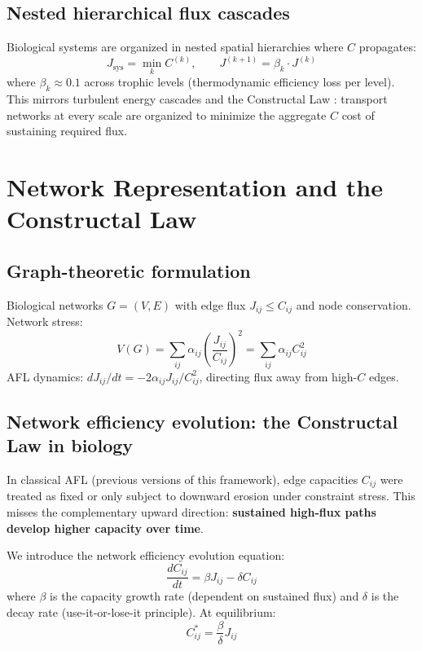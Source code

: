 \documentclass[12pt,a4paper]{article}
\begin{document}
\subsection{Nested hierarchical flux cascades}

Biological systems are organized in nested spatial hierarchies where $C$ propagates:
\begin{equation}
J_{\mathrm{sys}} = \min_k C^{(k)}, \qquad J^{(k+1)} = \beta_k \cdot J^{(k)}
\label{eq:cascade}
\end{equation}
where $\beta_k \approx 0.1$ across trophic levels (thermodynamic efficiency loss per level). This mirrors turbulent energy cascades \citep{kolmogorov1991,richardson1922} and the Constructal Law \citep{West1997}: transport networks at every scale are organized to minimize the aggregate $C$ cost of sustaining required flux.


\section{Network Representation and the Constructal Law}
\subsection{Graph-theoretic formulation}

Biological networks $G = (V, E)$ with edge flux $J_{ij} \leq C_{ij}$ and node conservation. Network stress:
\begin{equation}
V(G) = \sum_{ij} \alpha_{ij} \left(\frac{J_{ij}}{C_{ij}}\right)^2 = \sum_{ij} \alpha_{ij} C_{ij}^2
\label{eq:network_stress}
\end{equation}
AFL dynamics: $dJ_{ij}/dt = -2\alpha_{ij} J_{ij}/C_{ij}^2$, directing flux away from high-$C$ edges.

\subsection{Network efficiency evolution: the Constructal Law in biology}

In classical AFL (previous versions of this framework), edge capacities $C_{ij}$ were treated as fixed or only subject to downward erosion under constraint stress. This misses the complementary upward direction: \textbf{sustained high-flux paths develop higher capacity over time}.

We introduce the network efficiency evolution equation:
\begin{equation}
\frac{dC_{ij}}{dt} = \beta J_{ij} - \delta C_{ij}
\label{eq:constructal}
\end{equation}
where $\beta$ is the capacity growth rate (dependent on sustained flux) and $\delta$ is the decay rate (use-it-or-lose-it principle). At equilibrium:
\begin{equation}
C_{ij}^* = \frac{\beta}{\delta} J_{ij}
\label{eq:constructal_eq}
\end{equation}
\end{document}

